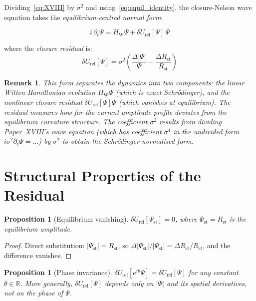 \documentclass[12pt]{article}
\newtheorem{proposition}[theorem]{Proposition}
\newtheorem{remark}[theorem]{Remark}
\newcommand{\HW}{H_{\mathrm{W}}}
\newcommand{\Rst}{R_{\mathrm{st}}}
\newcommand{\dUrel}{\delta U_{\mathrm{rel}}}
\begin{document}
Dividing~\eqref{eq:XVIII} by $\sigma^2$ and using~\eqref{eq:equil_identity}, the closure-Nelson wave equation takes the \textit{equilibrium-centred normal form}:

\begin{equation}\label{eq:normalform}
    \boxed{i\,\partial_t\Psi = \HW\Psi + \dUrel[\Psi]\,\Psi}
\end{equation}

where the \textit{closure residual} is:
\begin{equation}\label{eq:residual}
    \boxed{\dUrel[\Psi] = \sigma^2\left(\frac{\Delta|\Psi|}{|\Psi|} - \frac{\Delta\Rst}{\Rst}\right)}
\end{equation}

\begin{remark}
This form separates the dynamics into two components: the linear Witten-Hamiltonian evolution $\HW\Psi$ (which is exact Schr\"odinger), and the nonlinear closure residual $\dUrel[\Psi]\Psi$ (which vanishes at equilibrium). The residual measures how far the current amplitude profile deviates from the equilibrium curvature structure. The coefficient $\sigma^2$ results from dividing Paper~XVIII's wave equation (which has coefficient $\sigma^4$ in the undivided form $i\sigma^2\partial_t\Psi = \ldots$) by $\sigma^2$ to obtain the Schr\"odinger-normalised form.
\end{remark}

\section{Structural Properties of the Residual}\label{sec:structure}

\begin{proposition}[Equilibrium vanishing]\label{prop:vanishing}
$\dUrel[\Psi_{\mathrm{st}}] = 0$, where $\Psi_{\mathrm{st}} = \Rst$ is the equilibrium amplitude.
\end{proposition}

\begin{proof}
Direct substitution: $|\Psi_{\mathrm{st}}| = \Rst$, so $\Delta|\Psi_{\mathrm{st}}|/|\Psi_{\mathrm{st}}| = \Delta\Rst/\Rst$, and the difference vanishes.
\end{proof}

\begin{proposition}[Phase invariance]\label{prop:phase}
$\dUrel[e^{i\theta}\Psi] = \dUrel[\Psi]$ for any constant $\theta \in \mathbb{R}$. More generally, $\dUrel[\Psi]$ depends only on $|\Psi|$ and its spatial derivatives, not on the phase of $\Psi$.
\end{proposition}
\end{document}
